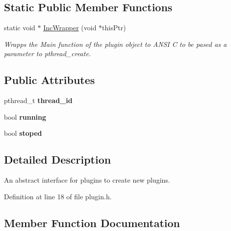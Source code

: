 \subsection*{Static Public Member Functions}
\begin{DoxyCompactItemize}
\item 
static void $\ast$ \hyperlink{class_i_plugin_a62d22be2fdf66eb7f5c2f797f5f3d7f3}{Inc\+Wrapper} (void $\ast$this\+Ptr)
\begin{DoxyCompactList}\small\item\em Wrapps the Main function of the plugin object to A\+N\+SI C to be pased as a parameter to pthread\+\_\+create. \end{DoxyCompactList}\end{DoxyCompactItemize}
\subsection*{Public Attributes}
\begin{DoxyCompactItemize}
\item 
\mbox{\label{class_i_plugin_a2b6bd7ba10e171049c50cfee4f7510b4}} 
pthread\+\_\+t {\bfseries thread\+\_\+id}
\item 
\mbox{\label{class_i_plugin_ae20c05c87269f8d66a50d6995dfb3f66}} 
bool {\bfseries running}
\item 
\mbox{\label{class_i_plugin_a9a89c705a50372eb079ac8e6f7a9286a}} 
bool {\bfseries stoped}
\end{DoxyCompactItemize}


\subsection{Detailed Description}
An abstract interface for plugins to create new plugins. 

Definition at line 18 of file plugin.\+h.



\subsection{Member Function Documentation}
\mbox{\label{class_i_plugin_a62d22be2fdf66eb7f5c2f797f5f3d7f3}} 
